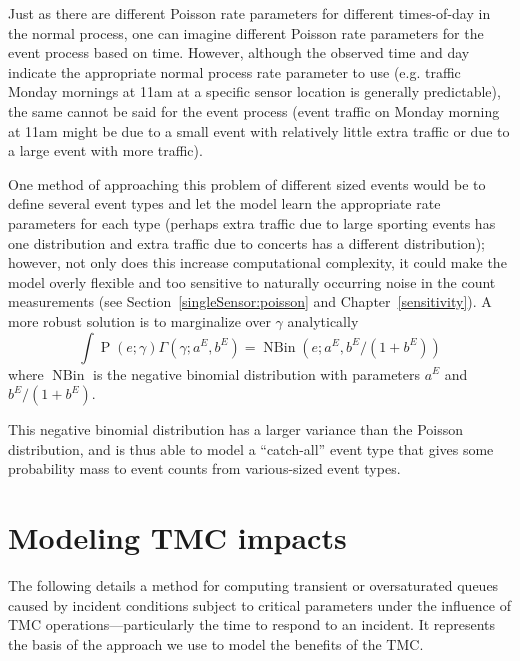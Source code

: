 \documentclass[12pt]{report}
\DeclareMathOperator{\poisson}{P} %
\DeclareMathOperator{\nbin}{NBin} %
\newcounter{time}
\begin{document}
Just as there are different Poisson rate parameters for different
times-of-day in the normal process, one can imagine different Poisson
rate parameters for the event process based on time.  However,
although the observed time and day indicate the appropriate normal
process rate parameter to use (e.g. traffic Monday mornings at 11am at
a specific sensor location is generally predictable), the same cannot
be said for the event process (event traffic on Monday morning at 11am
might be due to a small event with relatively little extra traffic or
due to a large event with more traffic).

One method of approaching this problem of different sized events would
be to define several event types and let the model learn the
appropriate rate parameters for each type (perhaps extra traffic due
to large sporting events has one distribution and extra traffic due to
concerts has a different distribution); however, not only does this
increase computational complexity, it could make the model overly
flexible and too sensitive to naturally occurring noise in the count
measurements (see Section~\ref{singleSensor:poisson} and
Chapter~\ref{sensitivity}).  A more robust solution is to marginalize
over $\gamma$ analytically
\begin{equation}\label{eq:nbin}
  \int \poisson(e; \gamma) \Gamma(\gamma; a^E,b^E) = \nbin(e; a^E, b^E/(1+b^E))
\end{equation}
where $\nbin$ is the negative binomial distribution with parameters
$a^E$ and $b^E/(1+b^E)$.

This negative binomial distribution has a larger variance than the
Poisson distribution, and is thus able to model a ``catch-all'' event
type that gives some probability mass to event counts from
various-sized event types.




\section{Modeling {TMC} impacts}
\label{sec:mod-tmc-impacts}

The following details a method for computing transient or
oversaturated queues caused by incident conditions subject to critical
parameters under the influence of \ac{TMC} operations---particularly
the time to respond to an incident. It represents the basis of the
approach we use to model the benefits of the \ac{TMC}.
\end{document}
